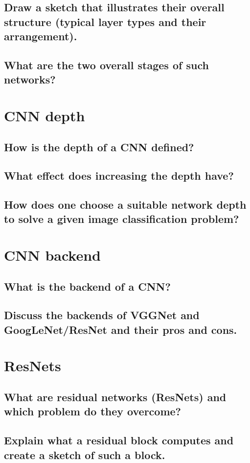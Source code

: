 \subsection{Draw a sketch that illustrates their overall structure (typical layer types and their arrangement).}
\subsection{What are the two overall stages of such networks?}

\section{CNN depth}
\subsection{How is the depth of a CNN defined?}
\subsection{What effect does increasing the depth have?}
\subsection{How does one choose a suitable network depth to solve a given image classification problem?}

\section{CNN backend}
\subsection{What is the backend of a CNN?}
\subsection{Discuss the backends of VGGNet and GoogLeNet/ResNet and their pros and cons.}

\section{ResNets}
\subsection{What are residual networks (ResNets) and which problem do they overcome?}
\subsection{Explain what a residual block computes and create a sketch of such a block.}

